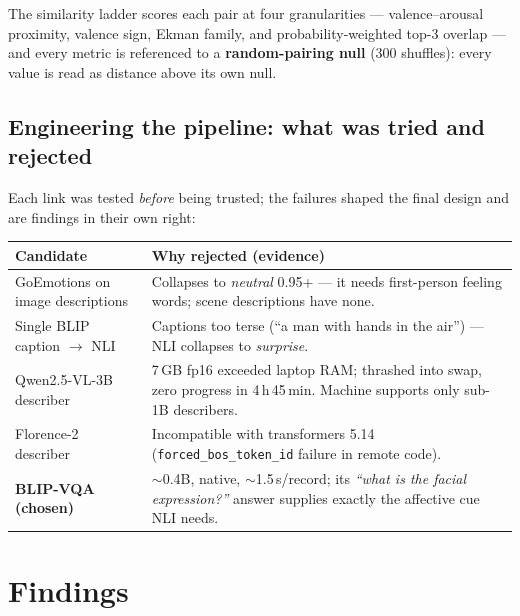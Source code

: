 \documentclass[11pt,a4paper]{article}
\begin{document}
The similarity ladder scores each pair at four granularities --- valence--arousal proximity,
valence sign, Ekman family, and probability-weighted top-3 overlap --- and every metric is
referenced to a \textbf{random-pairing null} (300 shuffles): every value is read as distance above
its own null.

\subsection{Engineering the pipeline: what was tried and rejected}
Each link was tested \emph{before} being trusted; the failures shaped the final design and are
findings in their own right:

\begin{center}
\begin{tabular}{@{}p{4.6cm}p{9.6cm}@{}}
\toprule
\textbf{Candidate} & \textbf{Why rejected (evidence)}\\
\midrule
GoEmotions on image descriptions & Collapses to \emph{neutral} 0.95+ --- it needs first-person feeling words; scene descriptions have none.\\
Single BLIP caption $\rightarrow$ NLI & Captions too terse (``a man with hands in the air'') --- NLI collapses to \emph{surprise}.\\
Qwen2.5-VL-3B describer & 7\,GB fp16 exceeded laptop RAM; thrashed into swap, zero progress in 4\,h\,45\,min. Machine supports only sub-1B describers.\\
Florence-2 describer & Incompatible with transformers 5.14 (\texttt{forced\_bos\_token\_id} failure in remote code).\\
\textbf{BLIP-VQA (chosen)} & $\sim$0.4B, native, $\sim$1.5\,s/record; its \emph{``what is the facial expression?''} answer supplies exactly the affective cue NLI needs.\\
\bottomrule
\end{tabular}
\end{center}

\section{Findings}
\end{document}
